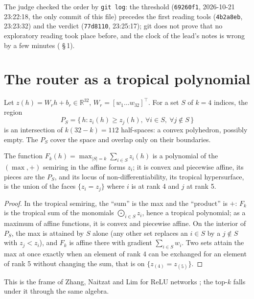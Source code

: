 The judge checked the order by \texttt{git log}: the threshold (\texttt{69260f1}, 2026-10-21 23:22:18, the only commit of this file) precedes the first reading tools (\texttt{4b2a8eb}, 23:23:32) and the verdict (\texttt{77d8110}, 23:25:17); git does not prove that no exploratory reading took place before, and the clock of the lead's notes is wrong by a few minutes ( §\,1).

\section{The router as a tropical polynomial}\label{t3tro:sec:tropical}

Let $z(h) = W_r h + b_r \in \mathbb{R}^{32}$, $W_r = [w_1 \dots w_{32}]^\top$. For a set $S$ of $k = 4$ indices, the region
\begin{equation}\label{t3tro:eq:region}
P_S = \{\, h : z_i(h) \ge z_j(h),\ \forall i \in S,\ \forall j \notin S \,\}
\end{equation}
is an intersection of $k(32 - k) = 112$ half-spaces: a convex polyhedron, possibly empty. The $P_S$ cover the space and overlap only on their boundaries.

\begin{proposition}\label{t3tro:prop:tropical}
The function $F_k(h) = \max_{|S| = k} \sum_{i \in S} z_i(h)$ is a polynomial of the $(\max, +)$ semiring in the affine forms $z_i$; it is convex and piecewise affine, its pieces are the $P_S$, and its locus of non-differentiability, its tropical hypersurface, is the union of the faces $\{z_i = z_j\}$ where $i$ is at rank 4 and $j$ at rank 5.
\end{proposition}
\begin{proof}
In the tropical semiring, the ``sum'' is the max and the ``product'' is $+$: $F_k$ is the tropical sum of the monomials $\bigodot_{i \in S} z_i$, hence a tropical polynomial; as a maximum of affine functions, it is convex and piecewise affine. On the interior of $P_S$, the max is attained by $S$ alone (any other set replaces an $i \in S$ by a $j \notin S$ with $z_j < z_i$), and $F_k$ is affine there with gradient $\sum_{i\in S} w_i$. Two sets attain the max at once exactly when an element of rank 4 can be exchanged for an element of rank 5 without changing the sum, that is on $\{z_{(4)} = z_{(5)}\}$.
\end{proof}
This is the frame of Zhang, Naitzat and Lim for ReLU networks \cite{zhang2018tropical}; the top-$k$ falls under it through the same algebra.

